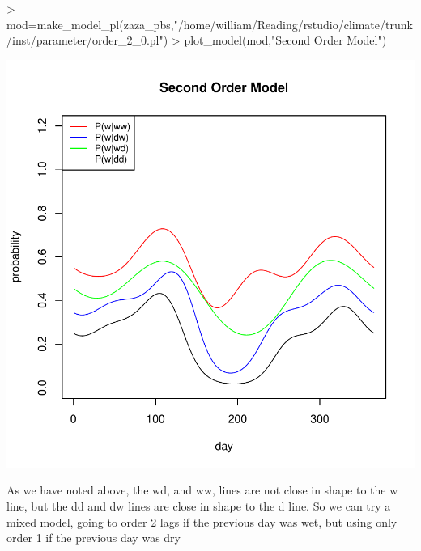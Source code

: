 \documentclass{article}
\begin{document}
\begin{Schunk}
\begin{Sinput}
> mod=make_model_pl(zaza_pbs,"/home/william/Reading/rstudio/climate/trunk/inst/parameter/order_2_0.pl")
> plot_model(mod,"Second Order Model")
\end{Sinput}
\end{Schunk}
\includegraphics{climate_vignette-011}

As we have noted above, the wd, and ww, lines are not close
in shape to the w line, but the dd and dw lines are close in
shape to the d line.   So we can try a mixed model, going
to order 2 lags if the previous day was wet, but using only
order 1 if the previous day was dry
\end{document}
